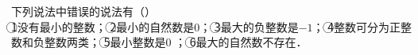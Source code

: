 下列说法中错误的说法有（\hspace{4em}）\\
\textcircled{1}没有最小的整数；
\textcircled{2}最小的自然数是$0$；	
\textcircled{3}最大的负整数是$-1$；
\textcircled{4}整数可分为正整数和负整数两类；
\textcircled{5}最小整数是$0$ ；
\textcircled{6}最大的自然数不存在．\\
